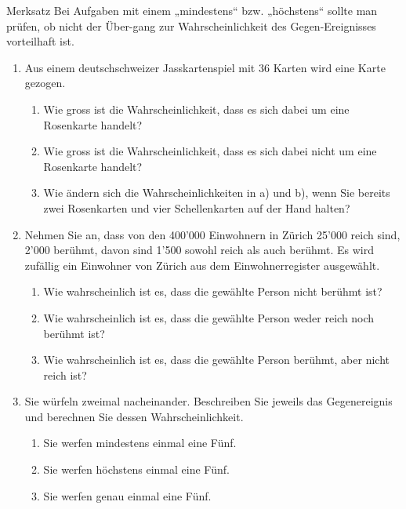 \begin{satz}
    {Merksatz}{}
    Bei Aufgaben mit einem „mindestens“ bzw. „höchstens“ sollte man prüfen, ob nicht der Über-gang zur Wahrscheinlichkeit des Gegen-Ereignisses vorteilhaft ist.
\end{satz}

\begin{ueb}
    {}{}
    \begin{enumerate}
        \item Aus einem deutschschweizer Jasskartenspiel mit 36 Karten wird eine Karte gezogen.
        \begin{enumerate}
            \item Wie gross ist die Wahrscheinlichkeit, dass es sich dabei um eine Rosenkarte handelt?
            \item Wie gross ist die Wahrscheinlichkeit, dass es sich dabei nicht um eine Rosenkarte handelt?
            \item Wie ändern sich die Wahrscheinlichkeiten in a) und b), wenn Sie bereits zwei Rosenkarten und vier Schellenkarten auf der Hand halten?
        \end{enumerate}
    
        \item Nehmen Sie an, dass von den 400'000 Einwohnern in Zürich 25'000 reich sind, 2'000 berühmt, davon sind 1'500 sowohl reich als auch berühmt. Es wird zufällig ein Einwohner von Zürich aus dem Einwohnerregister ausgewählt.
        \begin{enumerate}
            \item Wie wahrscheinlich ist es, dass die gewählte Person nicht berühmt ist?
            \item Wie wahrscheinlich ist es, dass die gewählte Person weder reich noch berühmt ist?
            \item Wie wahrscheinlich ist es, dass die gewählte Person berühmt, aber nicht reich ist?
        \end{enumerate}
    
        \item Sie würfeln zweimal nacheinander. Beschreiben Sie jeweils das Gegenereignis und berechnen Sie dessen Wahrscheinlichkeit.
        \begin{enumerate}
            \item Sie werfen mindestens einmal eine Fünf.
            \item Sie werfen höchstens einmal eine Fünf.
            \item Sie werfen genau einmal eine Fünf.
        \end{enumerate}
    

\end{enumerate}
\end{ueb}
